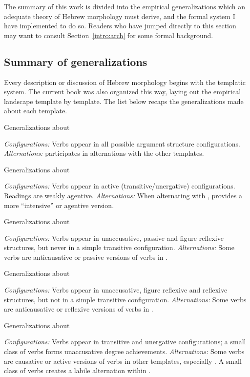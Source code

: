 The summary of this work is divided into the empirical generalizations which an adequate theory of Hebrew morphology must derive, and the formal system I have implemented to do so. Readers who have jumped directly to this section may want to consult Section~\ref{intro:arch} for some formal background.

\subsection{Summary of generalizations}
Every description or discussion of Hebrew morphology begins with the templatic system. The current book was also organized this way, laying out the empirical landscape template by template. The list below recaps the generalizations made about each template.

 \begin{exe}
 \ex  Generalizations about {\tkal}
 \begin{xlist} 
 	\ex  \textit{Configurations:} Verbs appear in all possible argument structure configurations. 
 	\ex  \textit{Alternations:} {\tkal} participates in alternations with the other templates. 
 \z

 \ex  Generalizations about {\tpie}
 \begin{xlist} 
 	\ex  \textit{Configurations:} Verbs appear in active (transitive/unergative) configurations. 
		Readings are weakly agentive.
 	\ex  \textit{Alternations:} When alternating with {\tkal}, {\tpie} provides a more ``intensive'' or agentive version. 
 \z

 \ex  Generalizations about {\tnif}
 \begin{xlist} 
 	\ex  \textit{Configurations:} Verbs appear in unaccusative, passive and figure reflexive structures, but never in a simple transitive configuration. 
 	\ex  \textit{Alternations:} Some verbs are anticausative or passive versions of verbs in {\tkal}. 
 \z

 \ex  Generalizations about {\thit}
 \begin{xlist} 
 	\ex  \textit{Configurations:} Verbs appear in unaccusative, figure reflexive and reflexive structures, but not in a simple transitive configuration. 
 	\ex \sloppy \textit{Alternations:} Some verbs are anticausative or reflexive versions of verbs in {\tpie}. 
 \z

 \ex  Generalizations about {\thif}
 \begin{xlist} 
 	\ex  \textit{Configurations:} Verbs appear in transitive and unergative configurations; a small class of verbs forms unaccusative degree achievements. 
 	\ex  \textit{Alternations:} Some verbs are causative or active versions of verbs in other templates, especially {\tkal}. A small class of verbs creates a labile alternation within {\thif}. 
 \z


\end{xlist}
\end{xlist}
\end{xlist}
\end{xlist}
\end{xlist}
\end{exe}
